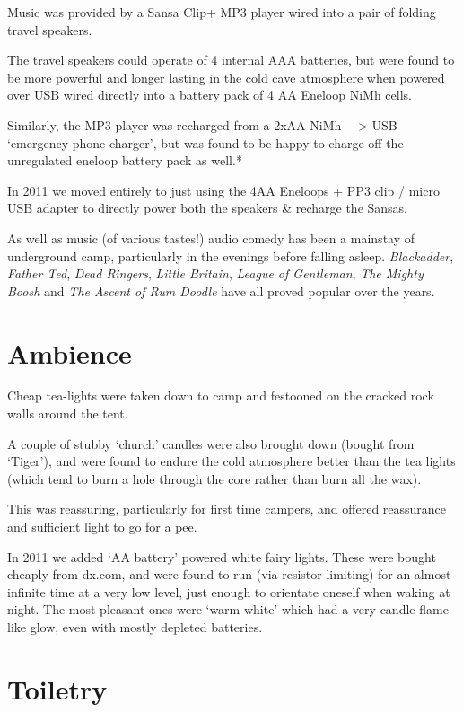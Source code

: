 Music was provided by a Sansa Clip+ MP3 player wired into a pair of folding travel speakers.

The travel speakers could operate of 4 internal AAA batteries, but were found to be more powerful and longer lasting in the cold cave atmosphere when powered over USB wired directly into a battery pack of 4 AA Eneloop NiMh cells.

Similarly, the MP3 player was recharged from a 2xAA NiMh
---\textgreater{} USB `emergency phone charger', but was found to be happy to charge off the unregulated eneloop battery pack as well.*
  
In 2011 we moved entirely to just using the 4AA Eneloops + PP3 clip /   micro USB adapter to directly power both the speakers \& recharge the Sansas.

As well as music (of various tastes!) audio comedy has been a mainstay of underground camp, particularly in the evenings before falling asleep. \textit{Blackadder}, \textit{Father Ted}, \textit{Dead Ringers}, \textit{Little Britain}, \textit{League of Gentleman}, \textit{The Mighty Boosh} and \textit{The Ascent of Rum Doodle} have all proved popular over the years.


\section{Ambience}

Cheap tea-lights were taken down to camp and festooned on the cracked rock walls around the tent.

A couple of stubby `church' candles were also brought down (bought from `Tiger'), and were found to endure the cold atmosphere better than the tea lights (which tend to burn a hole through the core rather than burn all the wax).

This was reassuring, particularly for first time campers, and offered reassurance and sufficient light to go for a pee.

In 2011 we added `AA battery' powered white fairy lights. These were bought cheaply from dx.com, and were found to run (via resistor limiting) for an almost infinite time at a very low level, just enough to orientate oneself when waking at night. The most pleasant ones were `warm white' which had a very candle-flame like glow, even with mostly depleted batteries.

\section{Toiletry}

